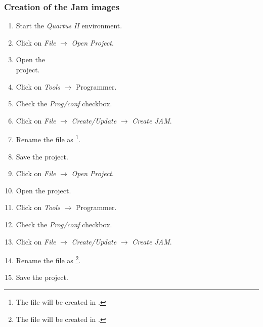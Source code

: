 \subsubsection{Creation of the Jam images}
\begin{enumerate}
\item Start the {\em Quartus II} environment.
\item Click on {\em File} $\to$ {\em Open Project}.
\item Open the
\\
project.
\item Click on {\em Tools} $\to$ {Programmer}.
\item Check the {\em Prog/conf} checkbox.
\item Click on {\em File} $\to$ {\em Create/Update} $\to$ {\em Create JAM}.
\item Rename the file as \footnote{The file will be created in
.}.
\item Save the project.

\item Click on {\em File} $\to$ {\em Open Project}.
\item Open the
 project.
\item Click on {\em Tools} $\to$ {Programmer}.
\item Check the {\em Prog/conf} checkbox.
\item Click on {\em File} $\to$ {\em Create/Update} $\to$ {\em Create JAM}.
\item Rename the file as \footnote{The file will be created in
.}.
\item Save the project.
\end{enumerate}


